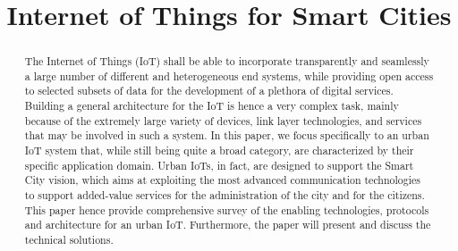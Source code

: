 \documentclass[conference]{IEEEtran}
\begin{document}
	
	\title{Internet of Things for Smart Cities}
	\author{}
	
	\maketitle
	
	\begin{abstract}
		The Internet of Things (IoT) shall be able to incorporate transparently and seamlessly a large number
		of different and heterogeneous end systems, while providing open access to selected subsets of data for the
		development of a plethora of digital services. Building a general architecture for the IoT is hence a very complex
		task, mainly because of the extremely large variety of devices, link layer technologies, and services that may
		be involved in such a system. In this paper, we focus specifically to an urban IoT system that, while still being quite a broad category, are characterized by their specific application domain. Urban IoTs, in fact, are designed to support the Smart City vision, which aims at exploiting the most advanced communication technologies to support added-value services for the administration of the city and for the citizens. This paper hence provide   comprehensive survey of the enabling technologies, protocols and architecture for an urban IoT. Furthermore, the paper will present and discuss the technical solutions.
		
		
	\end{abstract}

	\begin{IEEEkeywords}
		IoT,{Web Service Approach,Data Format, Application, Transport Layers,URI mapping,Devices 
	\end{IEEEkeywords}
	
\end{document}
